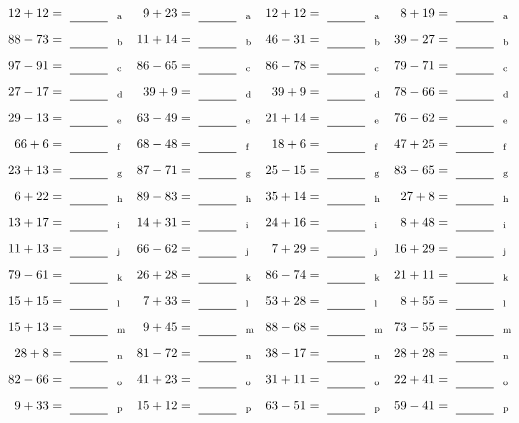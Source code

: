 \documentclass
[
  draft    = true,
  fontsize = 11pt,
  parskip  = half-
]
{scrartcl}
\begin{document}
\clearpage
\begin{align*}
    \pline{12+12}&=\rline{a}
  & \pline{9+23}&=\rline{a}
  & \pline{12+12}&=\rline{a}
  & \pline{8+19}&=\rline{a} \\[1ex]
    \pline{88-73}&=\rline{b}
  & \pline{11+14}&=\rline{b}
  & \pline{46-31}&=\rline{b}
  & \pline{39-27}&=\rline{b} \\[1ex]
    \pline{97-91}&=\rline{c}
  & \pline{86-65}&=\rline{c}
  & \pline{86-78}&=\rline{c}
  & \pline{79-71}&=\rline{c} \\[1ex]
    \pline{27-17}&=\rline{d}
  & \pline{39+9}&=\rline{d}
  & \pline{39+9}&=\rline{d}
  & \pline{78-66}&=\rline{d} \\[1ex]
    \pline{29-13}&=\rline{e}
  & \pline{63-49}&=\rline{e}
  & \pline{21+14}&=\rline{e}
  & \pline{76-62}&=\rline{e} \\[1ex]
    \pline{66+6}&=\rline{f}
  & \pline{68-48}&=\rline{f}
  & \pline{18+6}&=\rline{f}
  & \pline{47+25}&=\rline{f} \\[1ex]
    \pline{23+13}&=\rline{g}
  & \pline{87-71}&=\rline{g}
  & \pline{25-15}&=\rline{g}
  & \pline{83-65}&=\rline{g} \\[1ex]
    \pline{6+22}&=\rline{h}
  & \pline{89-83}&=\rline{h}
  & \pline{35+14}&=\rline{h}
  & \pline{27+8}&=\rline{h} \\[1ex]
    \pline{13+17}&=\rline{i}
  & \pline{14+31}&=\rline{i}
  & \pline{24+16}&=\rline{i}
  & \pline{8+48}&=\rline{i} \\[1ex]
    \pline{11+13}&=\rline{j}
  & \pline{66-62}&=\rline{j}
  & \pline{7+29}&=\rline{j}
  & \pline{16+29}&=\rline{j} \\[1ex]
    \pline{79-61}&=\rline{k}
  & \pline{26+28}&=\rline{k}
  & \pline{86-74}&=\rline{k}
  & \pline{21+11}&=\rline{k} \\[1ex]
    \pline{15+15}&=\rline{l}
  & \pline{7+33}&=\rline{l}
  & \pline{53+28}&=\rline{l}
  & \pline{8+55}&=\rline{l} \\[1ex]
    \pline{15+13}&=\rline{m}
  & \pline{9+45}&=\rline{m}
  & \pline{88-68}&=\rline{m}
  & \pline{73-55}&=\rline{m} \\[1ex]
    \pline{28+8}&=\rline{n}
  & \pline{81-72}&=\rline{n}
  & \pline{38-17}&=\rline{n}
  & \pline{28+28}&=\rline{n} \\[1ex]
    \pline{82-66}&=\rline{o}
  & \pline{41+23}&=\rline{o}
  & \pline{31+11}&=\rline{o}
  & \pline{22+41}&=\rline{o} \\[1ex]
    \pline{9+33}&=\rline{p}
  & \pline{15+12}&=\rline{p}
  & \pline{63-51}&=\rline{p}
  & \pline{59-41}&=\rline{p}
\end{align*}
\end{document}
